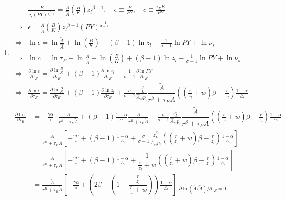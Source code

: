 \documentclass[12pt]{article} %
\begin{document}
\begin{enumerate}
 
    \item 

    \begin{align*}
        & \frac{E}{\nu_{s}(PY)^{\frac{\sigma_s}{\sigma_s - 1}}}  = \frac{\tilde{A}}{\hat{A}}(\frac{B}{K}) {{z_l}}^{\beta-1} , \quad \epsilon \equiv  \frac{E}{PY}, \quad c \equiv \frac{\tau_E E}{PY}\\
        \Rightarrow& \epsilon = \frac{\tilde{A}}{\hat{A}}(\frac{B}{K}) {{z_l}}^{\beta-1} ({PY})^{\frac{-1}{\sigma-1}}  \\
        \Rightarrow & \ln \epsilon =  \ln \frac{\tilde{A}}{\hat{A}} + \ln(\frac{B}{K}) + (\beta-1) \ln {{z_l}} - \frac{1}{\sigma -1} \ln PY + \ln \nu_{s} \\
        \Rightarrow & \ln c = \ln \tau_E + \ln \frac{\tilde{A}}{\hat{A}} + \ln(\frac{B}{K}) + (\beta-1) \ln {{z_l}} - \frac{1}{\sigma -1} \ln PY + \ln \nu_{s}
        \\
        \Rightarrow & \frac{\partial \ln \epsilon}{\partial \tau_E} =   \frac{\partial \ln \frac{B}{K} }{\partial \tau_E} 
        + (\beta - 1) \frac{\partial \ln z_l }{\partial \tau_E} - \frac{1}{\sigma -1} \frac{\partial\ln PY }{\partial \tau_E}\\
        \Rightarrow & \frac{\partial \ln \epsilon}{\partial \tau_E} =   \frac{\partial \ln \frac{B}{K} }{\partial \tau_E}
        + (\beta - 1) \frac{\partial \ln z_l }{\partial \tau_E}  + \frac{\sigma}{\sigma -1}\frac{z_L^{\beta}}{\hat{A}_{si}p_i} \dfrac{\tilde{A}}{r^\beta+\tau_E \tilde{A}}
        ((\frac{r}{z_l} + w)\beta-\frac{r}{z_l} )\frac{1-\alpha}{\triangle}
    \end{align*}
    \begin{align*}
        \frac{\partial \ln \epsilon}{\partial \tau_E}  &=   - \frac{\gamma\alpha}{\circ} \cdot \frac{\tilde{A}}{r^\beta+\tau_E \tilde{A}}	
        + (\beta-1) \frac{1-\alpha}{\triangle}\frac{\tilde{A}}{r^B + \tau_E\tilde{A}}
        + \frac{\sigma}{\sigma -1}\frac{z_L^{\beta}}{\hat{A}_{si}p_i} \dfrac{\tilde{A}}{r^\beta+\tau_E \tilde{A}}
        ((\frac{r}{z_l} + w)\beta-\frac{r}{z_l} )\frac{1-\alpha}{\triangle}\\
        &= \frac{\tilde{A}}{r^B + \tau_E\tilde{A}}\left[
            -\frac{\gamma\alpha}{\circ} 
            + (\beta-1) \frac{1-\alpha}{\triangle} 
            + \frac{\sigma}{\sigma -1}\frac{z_L^{\beta}}{{\hat{A}_{si}}p_i} {((\frac{r}{z_l} + w)\beta-\frac{r}{z_l} )}\frac{1-\alpha}{\triangle}
        \right]\\
        &= \frac{\tilde{A}}{r^B + \tau_E\tilde{A}}\left[
            -\frac{\gamma\alpha}{\circ} 
            + (\beta-1) \frac{1-\alpha}{\triangle} 
            + \dfrac{1}{\frac{r}{z_l} + w} {((\frac{r}{z_l} + w)\beta-\frac{r}{z_l} )}\frac{1-\alpha}{\triangle}
        \right]\\
        & = \frac{\tilde{A}}{r^B + \tau_E\tilde{A}}\left[
            -\frac{\gamma\alpha}{\circ} 
            + (2\beta - (1 + \dfrac{\frac{r}{z_l}}{\frac{r}{z_l} + w}))\frac{1-\alpha}{\triangle}
        \right]\left.\Bigg|_{\partial  \ln(\hat{A}/\tilde{A}) / \partial \tau_E = 0}\right.
    \end{align*}


\end{enumerate}
\end{document}
